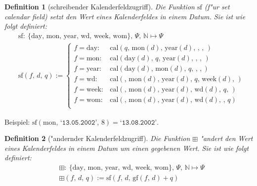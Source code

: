 \documentclass[a4paper]{article}
\newcommand*{\dayf}{\mathrm{day}}
\newcommand*{\monf}{\mathrm{mon}}
\newcommand*{\yearf}{\mathrm{year}}
\newcommand*{\wdf}{\mathrm{wd}}
\newcommand*{\weekf}{\mathrm{week}}
\newcommand*{\womf}{\mathrm{wom}}
\newcommand*{\calf}{\mathrm{cal}}
\newcommand*{\datev}[1]{\texttt{`#1'}}
\newcommand*{\gff}{\mathrm{gf}}
\newcommand*{\sff}{\mathrm{sf}}
\newcommand*{\addff}{\boxplus}
\numberwithin{equation}{section}
\newtheorem{dfn}{Definition}
\begin{document}
\begin{dfn}[schreibender Kalenderfeldzugriff]
  Die Funktion $\sff$ (f"ur \emph{set calendar field}) setzt den Wert eines
  Kalenderfeldes in einem Datum. Sie ist wie folgt definiert:
  \begin{equation}
  \begin{split}
    & \sff :\ \{\dayf,\,\monf,\,\yearf,\,\wdf,\,\weekf,\,\womf\},\,\Psi,\,
      \mathbb{N} \mapsto \Psi \\
    & \sff(f,\,d,\,q) := \left\{\begin{array}{ll}
        f = \dayf : & \calf(q,\,\monf(d),\,\yearf(d),\,,\,,\,) \\
        f = \monf : & \calf(\dayf(d),\,q,\,\yearf(d),\,,\,,\,) \\
        f = \yearf : & \calf(\dayf(d),\,\monf(d),\,q,\,,\,,) \\
        f = \wdf : & \calf(,\,\monf(d),\,\yearf(d),\,q,\,\weekf(d),\,) \\
        f = \weekf : & \calf(,\,\monf(d),\,\yearf(d),\,\wdf(d),\,q,\,) \\
        f = \womf : & \calf(,\,\monf(d),\,\yearf(d),\,\wdf(d),\,,\,q) \\
      \end{array}\right.
  \end{split}
  \end{equation}
\end{dfn}
\noindent Beispiel: $\sff(\monf,\,\datev{13.05.2002},\,8) = \datev{13.08.2002}$.

\begin{dfn}["andernder Kalenderfeldzugriff]
  Die Funktion $\addff$ "andert den Wert eines Kalenderfeldes in einem Datum um
  einen gegebenen Wert. Sie ist wie folgt definiert:
  \begin{equation}
  \begin{split}
    & \addff :\ \{\dayf,\,\monf,\,\yearf,\,\wdf,\,\weekf,\,\womf\},\,\Psi,\,
      \mathbb{N} \mapsto \Psi \\
    & \addff(f,\,d,\,q) := \sff(f,\,d,\,\gff(f,\,d) + q)
  \end{split}
  \end{equation}
\end{dfn}
\end{document}
